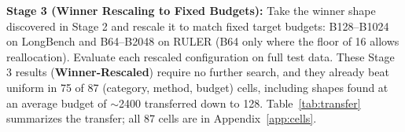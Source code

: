 \documentclass[11pt]{article}
\begin{document}
\textbf{Stage 3 (Winner Rescaling to Fixed Budgets):} Take the winner shape discovered in Stage 2 and rescale it to match fixed target budgets: B128--B1024 on LongBench and B64--B2048 on RULER (B64 only where the floor of 16 allows reallocation). Evaluate each rescaled configuration on full test data. These Stage 3 results (\textbf{Winner-Rescaled}) require no further search, and they already beat uniform in 75 of 87 (category, method, budget) cells, including shapes found at an average budget of $\sim$2400 transferred down to 128. Table~\ref{tab:transfer} summarizes the transfer; all 87 cells are in Appendix~\ref{app:cells}.

\begin{table}[htbp]
  \centering
  \scriptsize
  \setlength{\tabcolsep}{2.6pt}
  \renewcommand{\arraystretch}{0.92}
  
  \caption{\textbf{One search, many budgets.} Stage 3: the Stage 2 winner, found once at its natural average budget and rescaled to every target budget with no further search. Stage 4: NAS-refined, the best configuration of the budget-constrained search, available only at budgets where it ran. MOSAIC: its final configuration, the better of Winner and NAS-refined (chosen per budget), at the same budgets as Stage 4. Wins: budgets where the configuration beats uniform on full data; $\Delta$: mean gain over uniform. Llama-3-8B-Instruct; Mistral-7B-Instruct-v0.2 is in Table~\ref{tab:app-stages-mistral}.}
  \label{tab:transfer}
\end{table}
\end{document}
